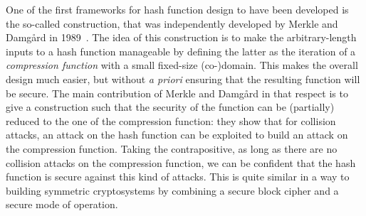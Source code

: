 One of the first frameworks for hash function design to have been developed is the so-called \merkdam construction, that was independently developed by
Merkle and Damg\aa rd in 1989~\cite{DBLP:conf/crypto/Merkle89a,DBLP:conf/crypto/Damgard89a}. The idea of this construction is to make the arbitrary-length
inputs to a hash function manageable by defining the latter as the iteration of a \emph{compression function} with a small fixed-size (co-)domain.
This makes the overall design much easier, but without \emph{a priori} ensuring that the resulting function will be secure. The main contribution of
Merkle and Damg\aa rd in that respect is to give a construction such that the security of the function can be (partially) reduced to the one of
the compression function: they show that for \eg collision attacks, an attack on the hash function can be exploited to build an attack on the compression function.
Taking the contrapositive, as long as there are no collision attacks on the compression function, we can be confident that the hash function is secure against this kind of attacks.
This is quite similar in a way to building symmetric cryptosystems by combining a secure block cipher and a secure mode of operation.

